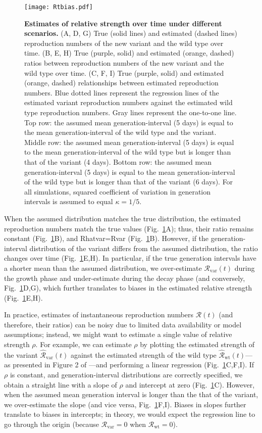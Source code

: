 \documentclass[12pt]{article}
\newcommand{\fref}[1]{Fig.~\ref{fig:#1}}
\newcommand{\vvvar}{\mathrm{var}}
\newcommand{\wwwt}{\mathrm{wt}}
\newcommand{\Rx}[1]{\ensuremath{{\mathcal R}_{#1}}\xspace}
\newcommand{\RR}{\ensuremath{{\mathcal R}}\xspace}
\newcommand{\Rw}{\Rx{\wwwt}}
\newcommand{\Rv}{\Rx{\vvvar}}
\begin{document}
\begin{figure}[!pht]
\texttt{[image: Rtbias.pdf]}
\caption{
\textbf{Estimates of relative strength over time under different scenarios.}
(A, D, G) True (solid lines) and estimated (dashed lines) reproduction numbers of the new variant and the wild type over time.
(B, E, H) True (purple, solid) and estimated (orange, dashed) ratios between reproduction numbers of the new variant and the wild type over time.
(C, F, I) True (purple, solid) and estimated (orange, dashed) relationships between estimated reproduction numbers.
Blue dotted lines represent the regression lines of the estimated variant reproduction numbers against the estimated wild type reproduction numbers.
Gray lines represent the one-to-one line.
Top row: the assumed mean generation-interval (5 days) is equal to the mean generation-interval of the wild type and the variant.
Middle row: the assumed mean generation-interval (5 days) is equal to the mean generation-interval of the wild type but is longer than that of the variant (4 days).
Bottom row: the assumed mean generation-interval (5 days) is equal to the mean generation-interval of the wild type but is longer than that of the variant (6 days).
For all simulations, squared coefficient of variation in generation intervals is assumed to equal $\kappa = 1/5$.
}
\label{fig:Rtbias}
\end{figure}

When the assumed distribution matches the true distribution, the estimated reproduction numbers match the true values (\fref{Rtbias}A); thus, their ratio remains constant (\fref{Rtbias}B), and Rhatvar=Rvar (\fref{Rtbias}B).
However, if the generation-interval distribution of the variant differs from the assumed distribution, the ratio changes over time (\fref{Rtbias}E,H).
In particular, if the true generation intervals have a shorter mean than the assumed distribution, we over-estimate $\Rv(t)$ during the growth phase and under-estimate during the decay phase (and conversely, \fref{Rtbias}D,G), which further translates to biases in the estimated relative strength (\fref{Rtbias}E,H).

In practice, estimates of instantaneous reproduction numbers $\RR(t)$ (and therefore, their ratios) can be noisy due to limited data availability or model assumptions;
instead, we might want to estimate a single value of relative strength $\rho$.
For example, we can estimate $\rho$ by plotting the estimated strength of the variant $\hat{\RR}_{\textrm{var}}(t)$ against the estimated strength of the wild type $\hat{\RR}_{\textrm{wt}}(t)$---as presented in Figure 2 of \cite{volz2021transmission}---and performing a linear regression (\fref{Rtbias}C,F,I).
If $\rho$ is constant, and generation-interval distributions are correctly specified, we obtain a straight line with a slope of $\rho$ and intercept at zero (\fref{Rtbias}C).
However, when the assumed mean generation interval is longer than the that of the variant, we over-estimate the slope (and vice versa, \fref{Rtbias}F,I).
Biases in slopes further translate to biases in intercepts; in theory, we would expect the regression line to go through the origin (because $\Rv = 0$ when $\Rw = 0$).
\end{document}
